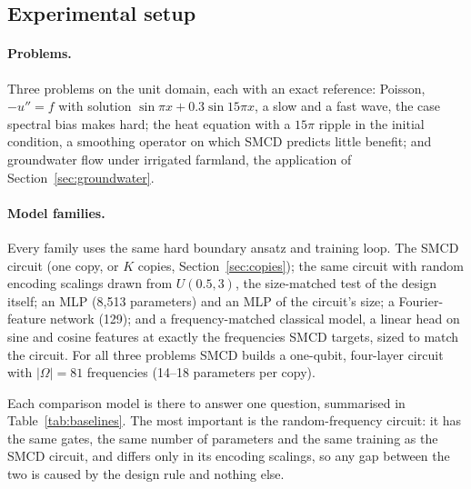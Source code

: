 \subsection{Experimental setup}
\label{sec:setup}

\paragraph{Problems.} Three problems on the unit domain, each with an exact reference:
Poisson, $-u''=f$ with solution $\sin\pi x+0.3\sin15\pi x$, a slow and a fast wave, the
case spectral bias makes hard; the heat equation with a $15\pi$ ripple in the initial
condition, a smoothing operator on which SMCD predicts little benefit; and groundwater
flow under irrigated farmland, the application of Section~\ref{sec:groundwater}.

\paragraph{Model families.} Every family uses the same hard boundary ansatz and training
loop. The SMCD circuit (one copy, or $K$ copies, Section~\ref{sec:copies}); the same
circuit with random encoding scalings drawn from $U(0.5,3)$, the size-matched test of the
design itself; an MLP (8{,}513 parameters) and an MLP of the circuit's size; a
Fourier-feature network (129); and a frequency-matched classical model, a linear head on
sine and cosine features at exactly the frequencies SMCD targets, sized to match the
circuit. For all three problems SMCD builds a one-qubit, four-layer circuit with
$|\Omega|=81$ frequencies (14--18 parameters per copy).

Each comparison model is there to answer one question, summarised in
Table~\ref{tab:baselines}. The most important is the random-frequency circuit: it has the
same gates, the same number of parameters and the same training as the SMCD circuit, and
differs only in its encoding scalings, so any gap between the two is caused by the design
rule and nothing else.

